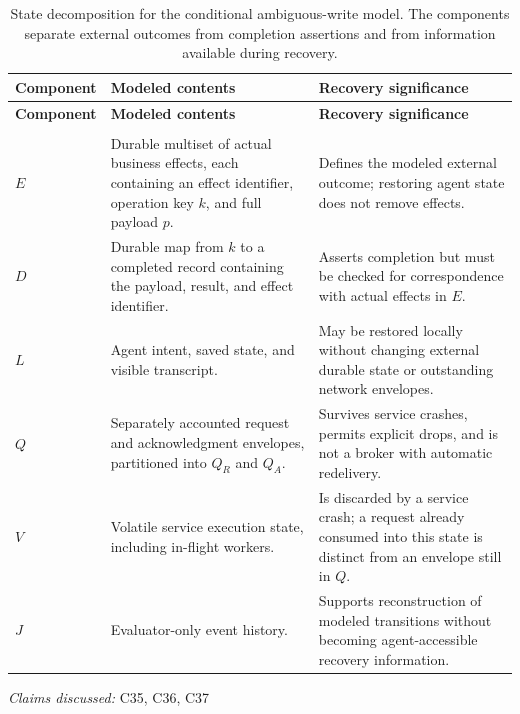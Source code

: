 \documentclass[11pt]{article}
\begin{document}
\begin{longtable}{@{}>{\raggedright\arraybackslash}p{}>{\raggedright\arraybackslash}p{}>{\raggedright\arraybackslash}p{}@{}}
\caption{State decomposition for the conditional ambiguous-write model. The components separate external outcomes from completion assertions and from information available during recovery.}\\
\toprule
\textbf{Component} & \textbf{Modeled contents} & \textbf{Recovery significance}\\
\midrule
\endfirsthead
\toprule
\textbf{Component} & \textbf{Modeled contents} & \textbf{Recovery significance}\\
\midrule
\endhead
\midrule
\multicolumn{3}{r}{\footnotesize Continued on next page}\\
\endfoot
\bottomrule
\endlastfoot
$E$ & Durable multiset of actual business effects, each containing an effect identifier, operation key $k$, and full payload $p$. & Defines the modeled external outcome; restoring agent state does not remove effects.\\
$D$ & Durable map from $k$ to a completed record containing the payload, result, and effect identifier. & Asserts completion but must be checked for correspondence with actual effects in $E$.\\
$L$ & Agent intent, saved state, and visible transcript. & May be restored locally without changing external durable state or outstanding network envelopes.\\
$Q$ & Separately accounted request and acknowledgment envelopes, partitioned into $Q_R$ and $Q_A$. & Survives service crashes, permits explicit drops, and is not a broker with automatic redelivery.\\
$V$ & Volatile service execution state, including in-flight workers. & Is discarded by a service crash; a request already consumed into this state is distinct from an envelope still in $Q$.\\
$J$ & Evaluator-only event history. & Supports reconstruction of modeled transitions without becoming agent-accessible recovery information.\\
\end{longtable}
\par{}
\textit{Claims discussed: }C35, C36, C37
\end{document}
